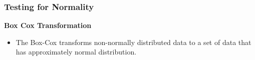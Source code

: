 \documentclass{beamer}
\begin{document}
		\begin{frame}[fragile]
			\frametitle{Testing for Normality}
			
			\textbf{Box Cox Transformation}
			\begin{itemize}
				\item The Box-Cox transforms non-normally distributed data to a set of data that has approximately normal distribution. 
			\end{itemize}
		\end{frame}
		
	
\end{document}
